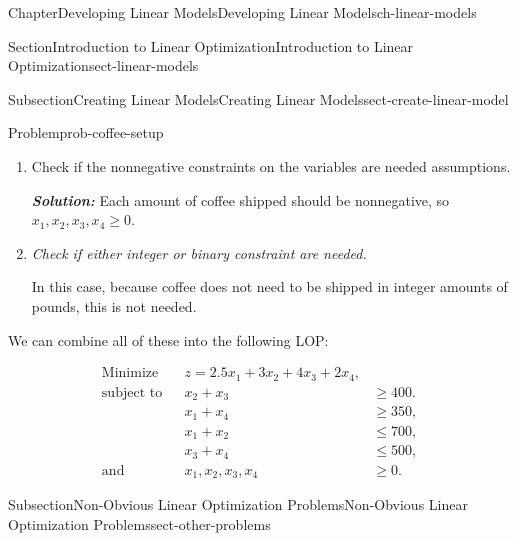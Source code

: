\documentclass[oneside,10pt,]{book}
\newcommand{\alert}[1]{\textbf{\textit{#1}}}
\numberwithin{equation}{section}
\newcommand{\amp}{&}
\begin{document}
\begin{chapterptx}{Chapter}{Developing Linear Models}{}{Developing Linear Models}{}{}{ch-linear-models}
\begin{sectionptx}{Section}{Introduction to Linear Optimization}{}{Introduction to Linear Optimization}{}{}{sect-linear-models}
\begin{subsectionptx}{Subsection}{Creating Linear Models}{}{Creating Linear Models}{}{}{sect-create-linear-model}
\begin{problem}{Problem}{}{prob-coffee-setup}
\begin{enumerate}
\par
%
\begin{align*}
x_2 + x_3 \amp \geq 400, \\
x_1 + x_4 \amp \geq 350.
\end{align*}
%
\par
Since the warehouses have a limited supply, they can only ship what they have so there are two additional constraints, one for each warehouse%
\par
%
\begin{align*}
x_1 + x_2 \amp \leq 700,\\
x_3 + x_4 \amp \leq 500.
\end{align*}
%
\item{}Check if the nonnegative constraints on the variables are needed assumptions.%
\par
\alert{Solution:} Each amount of coffee shipped should be nonnegative, so \(x_1, x_2, x_3, x_4 \geq 0\).%
\item{}\emph{Check if either integer or binary constraint are needed.}%
\par
In this case, because coffee does not need to be shipped in integer amounts of pounds, this is not needed.%
\end{enumerate}
%
\par
We can combine all of these into the following LOP:%
\par
%
\begin{equation*}
\begin{aligned} \text{Minimize} \amp \amp  z = 2.5 x_1 + 3 x_2 + 4 x_3 + 2 x_4,\amp \\ \text{subject to} \amp \amp x_2 + x_3 \amp \geq 400.\\ \amp \amp x_1 + x_4 \amp \geq 350,\\ \amp \amp x_1 + x_2 \amp \leq 700,\\ \amp \amp x_3 + x_4 \amp \leq 500,\\ \text{and}\amp \amp x_1, x_2, x_3, x_4 \amp \geq 0.
\end{aligned}
\end{equation*}
%
\end{problem}
\end{subsectionptx}
%
%
\typeout{************************************************}
\typeout{************************************************}
%
\begin{subsectionptx}{Subsection}{Non-Obvious Linear Optimization Problems}{}{Non-Obvious Linear Optimization Problems}{}{}{sect-other-problems}

\end{subsectionptx}
\end{sectionptx}
\end{chapterptx}
\end{document}
